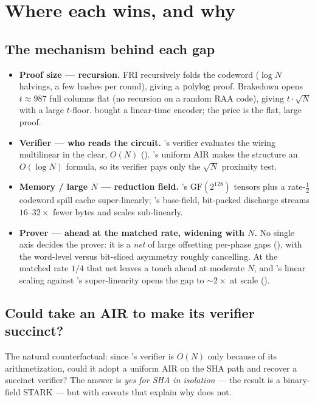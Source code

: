 \section{Where each wins, and why}
\label{sec:analysis}

\subsection{The mechanism behind each gap}

\begin{itemize}
  \item \textbf{Proof size --- recursion.} FRI recursively folds the
  codeword ($\log N$ halvings, a few hashes per round), giving a
  $\operatorname{polylog}$ proof. Brakedown opens $t\approx987$ full columns flat (no
  recursion on a random RAA code), giving $t\cdot\sqrt N$ with a large
  $t$-floor. \zinc{} bought a linear-time encoder; the price is the flat,
  large proof.
  \item \textbf{Verifier --- who reads the circuit.} \binius{}'s verifier
  evaluates the wiring multilinear in the clear, $O(N)$
  (). \zinc{}'s uniform AIR makes the structure an
  $O(\log N)$ formula, so its verifier pays only the $\sqrt N$ proximity
  test.
  \item \textbf{Memory / large $N$ --- reduction field.} \binius{}'s
  $\mathrm{GF}(2^{128})$ tensors plus a rate-$\tfrac12$ codeword spill
  cache super-linearly; \zinc{}'s base-field, bit-packed discharge streams
  $16$--$32\times$ fewer bytes and scales sub-linearly.
  \item \textbf{Prover --- \zinc{} ahead at the matched rate, widening
  with $N$.} No single axis decides the prover: it is a \emph{net} of
  large offsetting per-phase gaps (), with the
  word-level versus bit-sliced asymmetry roughly cancelling. At the
  matched rate $1/4$ that net leaves \zinc{} a touch ahead at moderate
  $N$, and \zinc{}'s linear scaling against \binius{}'s super-linearity
  opens the gap to $\sim$$2\times$ at scale ().
\end{itemize}

\subsection{Could \binius{} take an AIR to make its verifier succinct?}
\label{sec:ana-air}

The natural counterfactual: since \binius{}'s verifier is $O(N)$ only
because of its arithmetization, could it adopt a uniform AIR on the SHA
path and recover a succinct verifier? The answer is \emph{yes for SHA in
isolation} --- the result is a binary-field STARK --- but with caveats
that explain why \binius{} does not.

